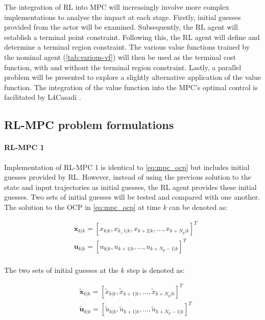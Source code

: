 The integration of RL into MPC will increasingly involve more complex implementations to analyse the impact at each stage. Firstly, initial guesses provided from the actor will be examined. Subsequently, the RL agent will establish a terminal point constraint. Following this, the RL agent will define and determine a terminal region constraint. The various value functions trained by the nominal agent (\autoref{tab:various-vf}) will then be used as the terminal cost function, with and without the terminal region constraint. Lastly, a parallel problem will be presented to explore a slightly alternative application of the value function. The integration of the value function into the MPC’s optimal control is facilitated by L4Casadi \cite{salzmannLearningCasADiDatadriven2023,salzmannRealtimeNeuralMPCDeep2023}.

\subsection{RL-MPC problem formulations}

\paragraph{RL-MPC 1}
Implementation of RL-MPC 1 is identical to \autoref{eq:mpc_ocp} but includes initial guesses provided by RL. However, instead of using the previous solution to the state and input trajectories as initial guesses, the RL agent provides these initial guesses. Two sets of initial guesses will be tested and compared with one another. The solution to the OCP in \autoref{eq:mpc_ocp} at time $k$ can be denoted as:

\begin{equation}\label{eq:sol-mpc-ocp}
	\begin{aligned}
		&\mathbf{x}_{k|k} = [x_{k|k},x_{k_+ 1|k},x_{k + 2|k}, ...,x_{k + N_p|k}]^T \\ 
		&\mathbf{u}_{k|k} = [u_{k|k},u_{k + 1|k}, ...,u_{k + N_p-1|k}]^T \\
	\end{aligned}
\end{equation}

The two sets of initial guesses at the $k$ step is denoted as:

\begin{equation}\label{eq:initial-guess-1}
	\begin{aligned}
		&\tilde{\mathbf{x}}_{k|k} = [\tilde{x}_{k|k},\tilde{x}_{k+1|k},...,\tilde{x}_{k + N_p|k}]^T \\ 
		&\tilde{\mathbf{u}}_{k|k} = [\tilde{u}_{k|k},\tilde{u}_{k + 1|k},...,\tilde{u}_{k + N_p - 1|k}]^T\\ 
	\end{aligned}
\end{equation}


